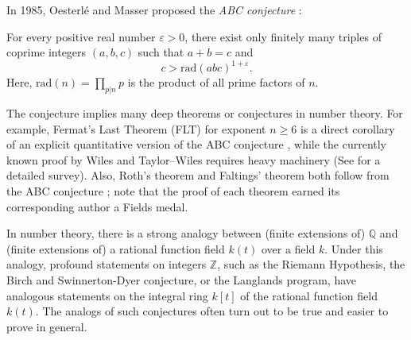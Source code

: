 \documentclass[runningheads]{llncs}
\newcommand{\rad}{\mathrm{rad}}
\begin{document}

In 1985, Oesterlé and Masser proposed the \emph{ABC conjecture} \cite{masser1985open,oesterle1988nouvelles}:
\begin{conjecture}
For every positive real number $\varepsilon > 0$, there exist only finitely many triples of coprime integers $(a, b, c)$ such that $a+b = c$ and 
\[
    c  > \rad(abc)^{1 + \varepsilon}.
\]
Here, $\rad(n) = \prod_{p|n} p$ is the product of all prime factors of $n$.
\end{conjecture}
The conjecture implies many deep theorems or conjectures in number theory.
For example, Fermat's Last Theorem (FLT) for exponent $n \geq 6$ is a direct corollary of an explicit quantitative version of the ABC conjecture \cite{granville02}, while the currently known proof by Wiles \cite{wiles95} and Taylor--Wiles \cite{taylor95} requires heavy machinery (See \cite{cornell13} for a detailed survey).
Also, Roth's theorem \cite{roth55} and Faltings' theorem \cite{faltings83} both follow from the ABC conjecture \cite{frankenhuysen99}; note that the proof of each theorem earned its corresponding author a Fields medal.


In number theory, there is a strong analogy between (finite extensions of) $\mathbb{Q}$ and (finite extensions of) a rational function field $k(t)$ over a field $k$.
Under this analogy, profound statements on integers $\mathbb{Z}$, such as the Riemann Hypothesis, the Birch and Swinnerton-Dyer conjecture, or the Langlands program, have analogous statements \cite{deligne74,deligne80,lafforgue02,tate95} on the integral ring $k[t]$ of the rational function field $k(t)$.
The analogs of such conjectures often turn out to be true and easier to prove in general.
\end{document}
